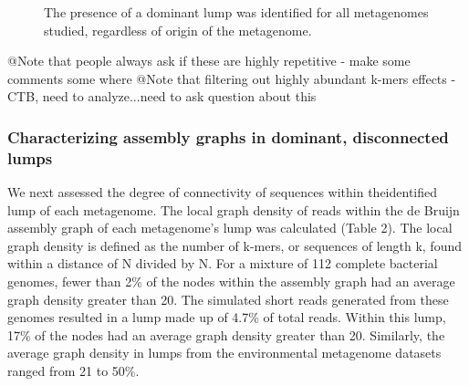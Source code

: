 \documentclass[11pt]{article} %
\begin{document}
\begin{figure}
\caption{The presence of a dominant lump was identified for all metagenomes studied, regardless of origin of the metagenome.}
\end{figure}

@Note that people always ask if these are highly repetitive - make some comments some where
@Note that filtering out highly abundant k-mers effects - CTB, need to analyze...need to ask question about this

\subsubsection{Characterizing assembly graphs in dominant, disconnected lumps}

We next assessed the degree of connectivity of sequences within theidentified lump of each metagenome.  The local graph density of reads within the de Bruijn assembly graph of each metagenome's lump was calculated (Table 2).  The local graph density is defined as the number of k-mers, or sequences of length k, found within a distance of N divided by N.  For a mixture of 112 complete bacterial genomes, fewer than 2\% of the nodes within the assembly graph had an average graph density greater than 20.   The simulated short reads generated from these genomes resulted in a lump made up of 4.7\% of total reads.  Within this lump, 17\% of the nodes had an average graph density greater than 20.  Similarly, the average graph density in lumps from the environmental metagenome datasets ranged from 21 to 50\%.  
\end{document}
